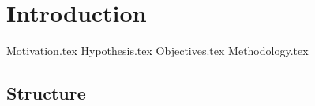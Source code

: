 \chapter{Introduction}
\label{chap:introduction}
  {Motivation.tex}
  {Hypothesis.tex}
  {Objectives.tex}
  {Methodology.tex}
  \section{Structure}
  \label{sec:structure}
    \Blindtext